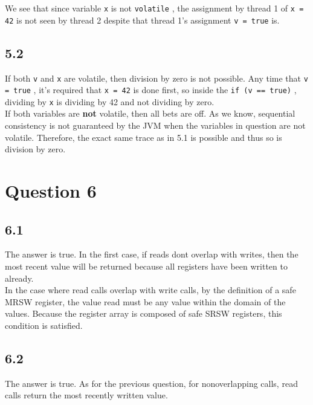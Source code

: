\documentclass[11pt, letterpaper]{article}
\newcommand{\code}[1] { \texttt{#1} }
\begin{document}
We see that since variable \code{x} is not \code{volatile}, the assignment by thread 1 of \code{x = 42} is not seen by thread 2 despite that thread 1's assignment \code{v = true} is.

\subsection*{5.2}
\label{sub:5_2}

If both \code{v} and \code{x} are volatile, then division by zero is not possible. Any time that \code{v = true}, it's required that \code{x = 42} is done first, so inside the \code{if (v == true)}, dividing by \code{x} is dividing by 42 and not dividing by zero.\\

If both variables are \textbf{not} volatile, then all bets are off. As we know, sequential consistency is not guaranteed by the JVM when the variables in question are not volatile. Therefore, the exact same trace as in 5.1 is possible and thus so is division by zero.

\newpage
\section*{Question 6}
\label{sec:question_6}

\subsection*{6.1}
\label{sub:6_1}

The answer is true. In the first case, if reads dont overlap with writes, then the most recent value will be returned because all registers have been written to already.\\

In the case where read calls overlap with write calls, by the definition of a safe MRSW register, the value read must be any value within the domain of the values. Because the register array is composed of safe SRSW registers, this condition is satisfied.

\subsection*{6.2}
\label{sub:6_2}

The answer is true. As for the previous question, for nonoverlapping calls, read calls return the most recently written value.\\
\end{document}
